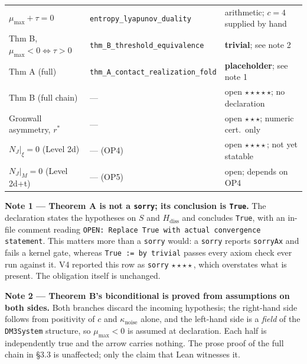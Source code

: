 \documentclass[11pt]{article}
\theoremstyle{boxed}
\begin{document}
{\begin{longtable}{@{}>{\raggedright\arraybackslash}p{} >{\raggedright\arraybackslash}p{} >{\raggedright\arraybackslash}p{}@{}}
$\mu_{\max} + \tau = 0$                  & \texttt{entropy\_lyapunov\_duality}     & arithmetic; $c=4$ supplied by hand\\
Thm B, $\mu_{\max}<0 \iff \tau>0$        & \texttt{thm\_B\_threshold\_equivalence} & \textbf{trivial}; see note 2\\
Thm A (full)                             & \texttt{thm\_A\_contact\_realization\_fold} & \textbf{placeholder}; see note 1\\
Thm B (full chain)                       & ---                                     & open $\star\star\star\star\star$; no declaration\\
Gronwall asymmetry, $r^{*}$              & ---                                     & open $\star\star\star$; numeric cert.\ only\\
$N_J|_\xi = 0$ (Level 2d)                & --- (OP4)                               & open $\star\star\star\star$; not yet statable\\
$N_J|_M = 0$ (Level 2d+t)                & --- (OP5)                               & open; depends on OP4\\
\bottomrule
\end{longtable}}

\noindent\textbf{Note 1 --- Theorem A is not a \texttt{sorry}; its conclusion is \texttt{True}.}
The declaration states the hypotheses on $S$ and $H_{\mathrm{diss}}$ and concludes \texttt{True},
with an in-file comment reading \texttt{OPEN: Replace True with actual convergence statement}. This
matters more than a \texttt{sorry} would: a \texttt{sorry} reports \texttt{sorryAx} and fails a
kernel gate, whereas \texttt{True := by trivial} passes every axiom check ever run against it. V4
reported this row as \texttt{sorry} $\star\star\star\star$, which overstates what is present. The
obligation itself is unchanged.

\smallskip
\noindent\textbf{Note 2 --- Theorem B's biconditional is proved from assumptions on both sides.}
Both branches discard the incoming hypothesis; the right-hand side follows from positivity of $c$
and $\kappa_{\mathrm{noise}}$ alone, and the left-hand side is a \emph{field} of the
\texttt{DM3System} structure, so $\mu_{\max}<0$ is assumed at declaration. Each half is
independently true and the arrow carries nothing. The prose proof of the full chain in \S 3.3 is
unaffected; only the claim that Lean witnesses it.
\end{document}
